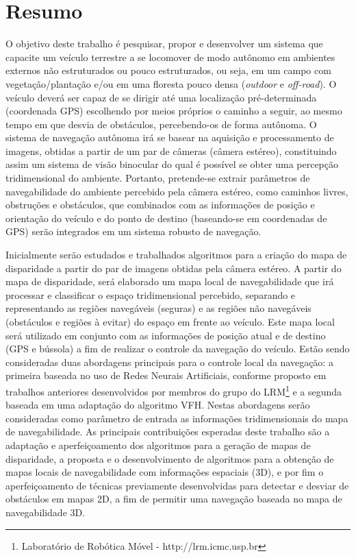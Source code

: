 \documentclass{article}
\newcommand{\foot}[1]{\footnote{	\fontfamily{cmss}\selectfont\footnotesize{#1}}}
\begin{document}
\tableofcontents
\newpage

\onehalfspacing

\section{Resumo}

O objetivo deste trabalho é pesquisar, propor e desenvolver um sistema que
capacite um veículo terrestre a se locomover de modo autônomo em ambientes
externos não estruturados ou pouco estruturados, ou seja, em um campo com
vegetação/plantação e/ou em uma floresta pouco densa (\textit{outdoor} e
\textit{off-road}). O veículo deverá ser capaz de se dirigir até uma localização
pré-determinada (coordenada GPS) escolhendo por meios próprios o caminho a
seguir, ao mesmo tempo em que desvia de obstáculos, percebendo-os de forma
autônoma. O sistema de navegação autônoma irá se basear na aquisição e
processamento de imagens, obtidas a partir de um par de câmeras (câmera
estéreo), constituindo assim um sistema de visão binocular do qual é possível se
obter uma percepção tridimensional do ambiente. Portanto, pretende-se extrair
parâmetros de navegabilidade do ambiente percebido pela câmera estéreo, como
caminhos livres, obstruções e obstáculos, que combinados com as informações de
posição e orientação do veículo e do ponto de destino (baseando-se em
coordenadas de GPS) serão integrados em um sistema robusto de navegação.

Inicialmente serão estudados e trabalhados algoritmos para a criação do mapa de
disparidade a partir do par de imagens obtidas pela câmera estéreo.
A partir do mapa de disparidade, será elaborado um mapa local de navegabilidade
que irá processar e classificar o espaço tridimensional percebido, separando e
representando as regiões navegáveis (seguras) e as regiões não navegáveis
(obstáculos e regiões à evitar) do espaço em frente ao veículo. Este mapa local
será utilizado em conjunto com as informações de posição atual e de destino (GPS
e bússola) a fim de realizar o controle da navegação do veículo. Estão sendo
consideradas duas abordagens principais para o controle local da navegação: a
primeira baseada no uso de Redes Neurais Artificiais, conforme proposto em
trabalhos anteriores desenvolvidos por membros do grupo do LRM\foot{Laboratório
de Robótica Móvel - http://lrm.icmc.usp.br} e a segunda baseada em uma adaptação
do algoritmo VFH. Nestas abordagens serão consideradas como parâmetro de entrada
as informações tridimensionais do mapa de navegabilidade. As principais
contribuições esperadas deste trabalho são a adaptação e aperfeiçoamento dos
algoritmos para a geração de mapas de disparidade, a proposta e o
desenvolvimento de algoritmos para a obtenção de mapas locais de navegabilidade
com informações espaciais (3D), e por fim o aperfeiçoamento de técnicas
previamente desenvolvidas para detectar e desviar de obstáculos em mapas 2D, a
fim de permitir uma navegação baseada no mapa de navegabilidade 3D.
\end{document}
